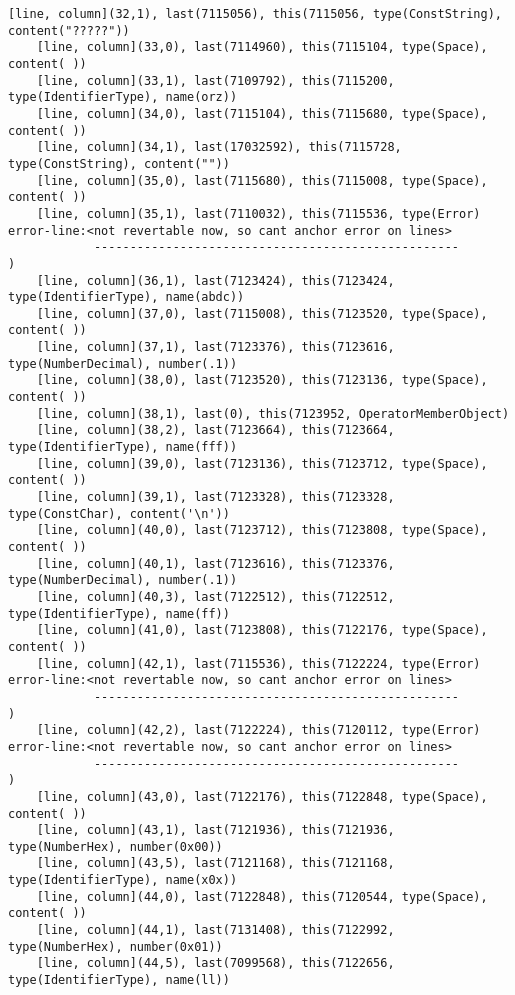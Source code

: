 \documentclass[UTF8]{ctexart}
\begin{document}
{\begin{lstlisting}[language={[ANSI]C++}]
    [line, column](32,1), last(7115056), this(7115056, type(ConstString), content("?????"))
    [line, column](33,0), last(7114960), this(7115104, type(Space), content( ))
    [line, column](33,1), last(7109792), this(7115200, type(IdentifierType), name(orz))
    [line, column](34,0), last(7115104), this(7115680, type(Space), content( ))
    [line, column](34,1), last(17032592), this(7115728, type(ConstString), content(""))
    [line, column](35,0), last(7115680), this(7115008, type(Space), content( ))
    [line, column](35,1), last(7110032), this(7115536, type(Error)
error-line:<not revertable now, so cant anchor error on lines>
            ---------------------------------------------------
)
    [line, column](36,1), last(7123424), this(7123424, type(IdentifierType), name(abdc))
    [line, column](37,0), last(7115008), this(7123520, type(Space), content( ))
    [line, column](37,1), last(7123376), this(7123616, type(NumberDecimal), number(.1))
    [line, column](38,0), last(7123520), this(7123136, type(Space), content( ))
    [line, column](38,1), last(0), this(7123952, OperatorMemberObject)
    [line, column](38,2), last(7123664), this(7123664, type(IdentifierType), name(fff))
    [line, column](39,0), last(7123136), this(7123712, type(Space), content( ))
    [line, column](39,1), last(7123328), this(7123328, type(ConstChar), content('\n'))
    [line, column](40,0), last(7123712), this(7123808, type(Space), content( ))
    [line, column](40,1), last(7123616), this(7123376, type(NumberDecimal), number(.1))
    [line, column](40,3), last(7122512), this(7122512, type(IdentifierType), name(ff))
    [line, column](41,0), last(7123808), this(7122176, type(Space), content( ))
    [line, column](42,1), last(7115536), this(7122224, type(Error)
error-line:<not revertable now, so cant anchor error on lines>
            ---------------------------------------------------
)
    [line, column](42,2), last(7122224), this(7120112, type(Error)
error-line:<not revertable now, so cant anchor error on lines>
            ---------------------------------------------------
)
    [line, column](43,0), last(7122176), this(7122848, type(Space), content( ))
    [line, column](43,1), last(7121936), this(7121936, type(NumberHex), number(0x00))
    [line, column](43,5), last(7121168), this(7121168, type(IdentifierType), name(x0x))
    [line, column](44,0), last(7122848), this(7120544, type(Space), content( ))
    [line, column](44,1), last(7131408), this(7122992, type(NumberHex), number(0x01))
    [line, column](44,5), last(7099568), this(7122656, type(IdentifierType), name(ll))

\end{lstlisting}}
\end{document}
